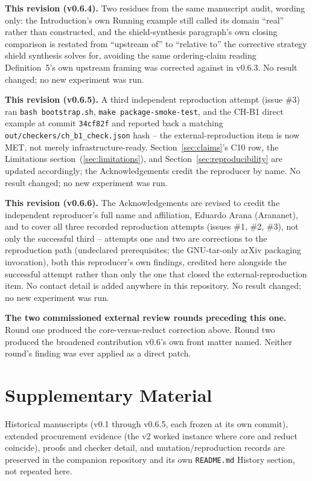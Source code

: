 \documentclass[11pt,a4paper]{article}
\theoremstyle{definition}
\begin{document}
\noindent\textbf{This revision (v0.6.4).} Two residues from the same manuscript audit, wording only: the Introduction's own Running example still called its domain ``real'' rather than constructed, and the shield-synthesis paragraph's own closing comparison is restated from ``upstream of'' to ``relative to'' the corrective strategy shield synthesis solves for, avoiding the same ordering-claim reading Definition~5's own upstream framing was corrected against in v0.6.3. No result changed; no new experiment was run.

\noindent\textbf{This revision (v0.6.5).} A third independent reproduction attempt (issue \#3) ran \texttt{bash bootstrap.sh}, \texttt{make package-smoke-test}, and the CH-B1 direct example at commit \texttt{34cf82f} and reported back a matching \texttt{out/checkers/ch\_b1\_check.json} hash -- the external-reproduction item is now MET, not merely infrastructure-ready. Section~\ref{sec:claims}'s C10 row, the Limitations section~(\ref{sec:limitations}), and Section~\ref{sec:reproducibility} are updated accordingly; the Acknowledgements credit the reproducer by name. No result changed; no new experiment was run.

\noindent\textbf{This revision (v0.6.6).} The Acknowledgements are revised to credit the independent reproducer's full name and affiliation, Eduardo Arana (Arananet), and to cover all three recorded reproduction attempts (issues \#1, \#2, \#3), not only the successful third -- attempts one and two are corrections to the reproduction path (undeclared prerequisites; the GNU-tar-only arXiv packaging invocation), both this reproducer's own findings, credited here alongside the successful attempt rather than only the one that closed the external-reproduction item. No contact detail is added anywhere in this repository. No result changed; no new experiment was run.

\noindent\textbf{The two commissioned external review rounds preceding this one.} Round one produced the core-versus-reduct correction above. Round two produced the broadened contribution v0.6's own front matter named. Neither round's finding was ever applied as a direct patch.

\section{Supplementary Material}
\label{sec:supplementary}

Historical manuscripts (v0.1 through v0.6.5, each frozen at its own commit), extended procurement evidence (the v2 worked instance where core and reduct coincide), proofs and checker detail, and mutation/reproduction records are preserved in the companion repository and its own \texttt{README.md} History section, not repeated here.
\end{document}
